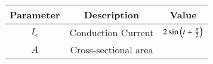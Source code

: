 \setlength{\arrayrulewidth}{0.3mm}
\setlength{\tabcolsep}{20pt}
\renewcommand{\arraystretch}{1.5}

\begin{tabular}{|c|c|c|}
\hline
Parameter& Description & Value\\
\hline
$I_c$ & Conduction Current & $2\sin\left(t + \frac{\pi}{2}\right)$\\
\hline
$A$ & Cross-sectional area & \\
\hline
\end{tabular}
